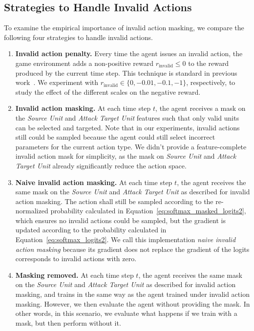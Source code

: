 \documentclass[letterpaper]{article}
\begin{document}
\subsection{Strategies to Handle Invalid Actions}
To examine the empirical importance of invalid action masking, we compare the following four strategies to handle invalid actions.
\begin{enumerate}
    \item \textbf{Invalid action penalty.} Every time the agent issues an invalid action, the game environment adds a non-positive reward $r_{\text{invalid}} \leq 0$ to the reward produced by the current time step. This technique is standard in previous work~\cite{dietterich2000hierarchical}. We experiment with $r_{\text{invalid}} \in \{0, -0.01, -0.1, -1\}$, respectively, to study the effect of the different scales on the negative reward.
    \item \textbf{Invalid action masking.} At each time step $t$, the agent receives a mask on the {\em Source Unit} and {\em Attack Target Unit} features such that only valid units can be selected and targeted. Note that in our experiments, invalid actions still could be sampled because the agent could still select incorrect parameters for the current action type. We didn't provide a feature-complete invalid action mask for simplicity, as the mask on {\em Source Unit} and {\em Attack Target Unit} already significantly reduce the action space.
    \item \textbf{Naive invalid action masking.} At each time step $t$, the agent receives the same mask on the {\em Source Unit} and {\em Attack Target Unit} as described  for invalid action masking. The action shall still be sampled according to the re-normalized probability calculated in Equation~\ref{eq:softmax_masked_logits2}, which ensures no invalid actions could be sampled, but  the gradient is updated according to the probability calculated in Equation~\ref{eq:softmax_logits2}. We call this implementation \emph{naive invalid action masking} because its gradient does not replace the gradient of the logits corresponds to invalid actions with zero.

    \item \textbf{Masking removed.} At each time step $t$, the agent receives the same mask on the {\em Source Unit} and {\em Attack Target Unit} as described for invalid action masking, and trains in the same way as the agent trained under invalid action masking. However, we then evaluate the agent without providing the mask. In other words, in this scenario, we evaluate what happens if we train with a mask, but then perform without it.
\end{enumerate}
\end{document}
